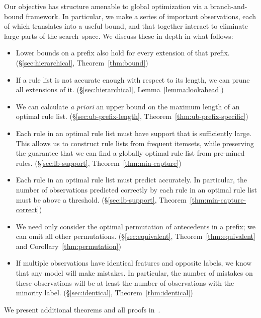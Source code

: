 Our objective has structure amenable to global optimization via a branch-and-bound framework.
%
In particular, we make a series of important observations, each of which translates into
a useful bound, and that together interact to eliminate large parts of the search~space.
%
We discuss these in depth in what follows:
%
\begin{itemize}
\item Lower bounds on a prefix also hold for every extension of that prefix.
(\S\ref{sec:hierarchical}, Theorem~\ref{thm:bound})

\item If a rule list is not accurate enough with respect to its length,
we can prune all extensions of it.
(\S\ref{sec:hierarchical}, Lemma~\ref{lemma:lookahead})

\item We can calculate \emph{a priori} an upper bound on the maximum length
of an optimal rule list.
(\S\ref{sec:ub-prefix-length}, Theorem~\ref{thm:ub-prefix-specific})

\item Each rule in an optimal rule list must have support that is sufficiently large.
%
This allows us to construct rule lists from frequent itemsets,
while preserving the guarantee that we can find a globally optimal
rule list from pre-mined rules.
(\S\ref{sec:lb-support}, Theorem~\ref{thm:min-capture})

\item Each rule in an optimal rule list must predict accurately.
%
In particular, the number of observations predicted correctly
by each rule in an optimal rule list must be above a threshold.
(\S\ref{sec:lb-support}, Theorem~\ref{thm:min-capture-correct})

\item We need only consider the optimal permutation of antecedents in a prefix;
we can omit all other permutations.
(\S\ref{sec:equivalent}, Theorem~\ref{thm:equivalent} and Corollary~\ref{thm:permutation})

\item  If multiple observations have identical features and opposite labels,
we know that any model will make mistakes.
%
In particular, the number of mistakes on these observations will be at least
the number of observations with the minority label.
(\S\ref{sec:identical}, Theorem~\ref{thm:identical})
\end{itemize}
\begin{kdd}
We present additional theorems and all proofs in~\citep{AngelinoLaAlSeRu17}.
\end{kdd}

